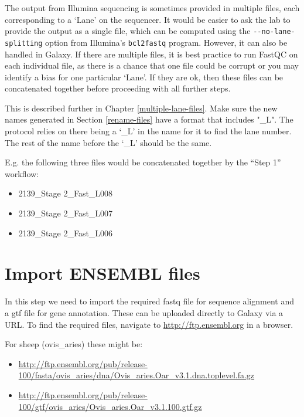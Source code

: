 \documentclass[
]{book}
\providecommand{\tightlist}{%
  \setlength{\itemsep}{0pt}\setlength{\parskip}{0pt}}
\begin{document}
The output from Illumina sequencing is sometimes provided in multiple files, each corresponding to a `Lane' on the sequencer. It would be easier to ask the lab to provide the output as a single file, which can be computed using the \texttt{-\/-no-lane-splitting} option from Illumina's \texttt{bcl2fastq} program. However, it can also be handled in Galaxy. If there are multiple files, it is best practice to run FastQC on each individual file, as there is a chance that one file could be corrupt or you may identify a bias for one particular `Lane'. If they are ok, then these files can be concatenated together before proceeding with all further steps.

This is described further in Chapter \ref{multiple-lane-files}. Make sure the new names generated in Section \ref{rename-files} have a format that includes "\_L". The protocol relies on there being a `\_L' in the name for it to find the lane number. The rest of the name before the `\_L' should be the same.

E.g. the following three files would be concatenated together by the ``Step 1'' workflow:

\begin{itemize}
\tightlist
\item
  2139\_Stage 2\_Fast\_L008
\item
  2139\_Stage 2\_Fast\_L007
\item
  2139\_Stage 2\_Fast\_L006
\end{itemize}

\hypertarget{import-ensembl-files}{%
\section{Import ENSEMBL files}\label{import-ensembl-files}}

In this step we need to import the required fastq file for sequence alignment and a gtf file for gene annotation.
These can be uploaded directly to Galaxy via a URL. To find the required files, navigate to \url{http://ftp.ensembl.org} in a browser.

For sheep (ovis\_aries) these might be:

\begin{itemize}
\tightlist
\item
  \url{http://ftp.ensembl.org/pub/release-100/fasta/ovis_aries/dna/Ovis_aries.Oar_v3.1.dna.toplevel.fa.gz}
\item
  \url{http://ftp.ensembl.org/pub/release-100/gtf/ovis_aries/Ovis_aries.Oar_v3.1.100.gtf.gz}
\end{itemize}
\end{document}
